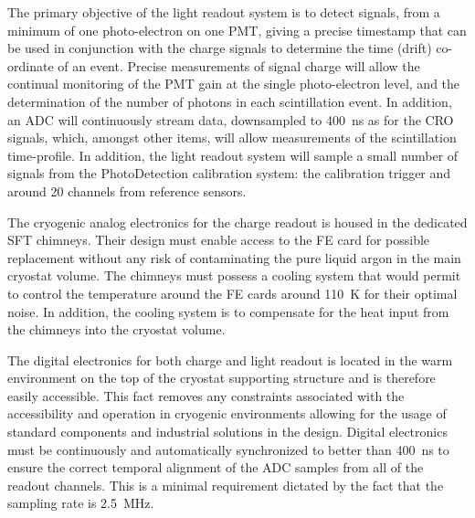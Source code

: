 
The primary objective of the light readout system is to detect signals, from a minimum of one photo-electron on one PMT, giving a precise timestamp that can be used in conjunction with the charge signals to determine the time (drift) co-ordinate of an event.  Precise measurements of signal charge will allow the continual monitoring of the PMT gain at the single photo-electron level, and the determination of the number of photons in each scintillation event.  In addition, an ADC will continuously stream data, downsampled to \SI{400}{ns} as for the CRO signals,  which, amongst other items, will allow measurements of the scintillation time-profile. In addition, the light readout system will sample a small number of signals from the PhotoDetection calibration system: the calibration trigger and around \num{20} channels from reference sensors.

The cryogenic analog electronics for the charge readout is housed in the dedicated SFT chimneys. Their design must enable access to the FE card for possible replacement without any risk of contaminating the pure liquid argon in the main cryostat volume. The chimneys must possess a cooling system that would permit to control the temperature around the FE cards around \SI{110}{\kelvin} for their optimal noise. In addition, the cooling system is to compensate for the heat input from the chimneys into the cryostat volume.

The digital electronics for both charge and light readout is located in the warm environment on the top of the cryostat supporting structure and is therefore easily accessible. This fact removes any constraints associated with the accessibility and operation in cryogenic environments allowing for the usage of standard components and industrial solutions in the design. Digital electronics must be continuously and automatically synchronized to better than \SI{400}{ns} to ensure the correct temporal alignment of the ADC samples from all of the readout channels. This is a minimal requirement dictated by the fact that the sampling rate is \SI{2.5}{\MHz}.  

